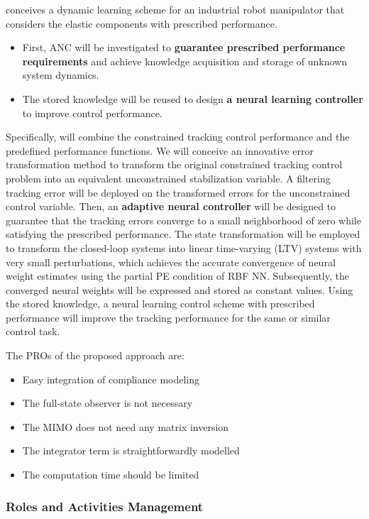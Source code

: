  conceives a dynamic learning scheme for an industrial
robot manipulator that considers the elastic components with prescribed
performance.

\begin{itemize}[arrow]
\item
  First, ANC will be investigated to \textbf{guarantee prescribed
  performance requirements} and achieve knowledge acquisition and
  storage of unknown system dynamics.
\item
  The stored knowledge will be reused to design \textbf{a neural
  learning controller} to improve control performance.
\end{itemize}

Specifically,  will combine the constrained tracking
control performance and the predefined performance functions. We will
conceive an innovative error transformation method to transform the
original constrained tracking control problem into an equivalent
unconstrained stabilization variable. A filtering tracking error will be
deployed on the transformed errors for the unconstrained control
variable. Then, an \textbf{adaptive neural controller} will be designed
to guarantee that the tracking errors converge to a small neighborhood
of zero while satisfying the prescribed performance. The state
transformation will be employed to transform the closed-loop systems
into linear time-varying (LTV) systems with very small perturbations,
which achieves the accurate convergence of neural weight estimates using
the partial PE condition of RBF NN. Subsequently, the converged neural
weights will be expressed and stored as constant values. Using the
stored knowledge, a neural learning control scheme with prescribed
performance will improve the tracking performance for the same or
similar control task.

The PROs of the proposed approach are:

\begin{itemize}
\item
  Easy integration of compliance modeling
\item
  The full-state observer is not necessary
\item
  The MIMO does not need any matrix inversion
\item
  The integrator term is straightforwardly modelled
\item
  The computation time should be limited
\end{itemize}

\subsubsection{\texorpdfstring{Roles and Activities Management
}{Roles and Activities Management }}\label{roles-and-activities-management-2}

